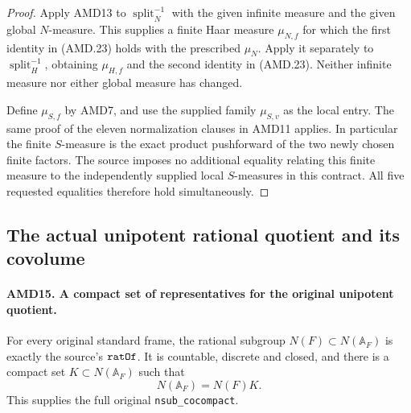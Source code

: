 \documentclass[11pt,a4paper]{article}
\numberwithin{equation}{section}
\theoremstyle{remark}\newtheorem{remark}[theorem]{Remark}
\begin{document}
\begin{proof}
Apply AMD13 to \(\operatorname{split}_N^{-1}\) with the
given infinite measure and the given global \(N\)-measure.
This supplies a finite Haar measure \(\mu_{N,f}\) for which
the first identity in (AMD.23) holds with the prescribed
\(\mu_N\).  Apply it separately to
\(\operatorname{split}_H^{-1}\), obtaining \(\mu_{H,f}\)
and the second identity in (AMD.23).  Neither infinite measure
nor either global measure has changed.

Define \(\mu_{S,f}\) by AMD7, and use the supplied family
\(\mu_{S,v}\) as the local entry.  The same proof of the
eleven normalization clauses in AMD11 applies.  In particular
the finite \(S\)-measure is the exact product pushforward of
the two newly chosen finite factors.  The source imposes no
additional equality relating this finite measure to the
independently supplied local \(S\)-measures in this contract.
All five requested equalities therefore hold simultaneously.
\end{proof}

\subsection{The actual unipotent rational quotient and its covolume}

\paragraph{AMD15. A compact set of representatives for the original unipotent quotient.}
\label{claim:AMD15}
For every original standard frame, the rational subgroup
\(N(F)\subset N(\mathbb A_F)\) is exactly the source's
\(\texttt{rat\allowbreak Of}\).  It is countable, discrete and closed,
and there is a compact set \(K\subset N(\mathbb A_F)\)
such that
\[
                    N(\mathbb A_F)=N(F)K.
 \tag{AMD.28}
\]
This supplies the full original \texttt{nsub\_\allowbreak cocompact}.
\end{document}
